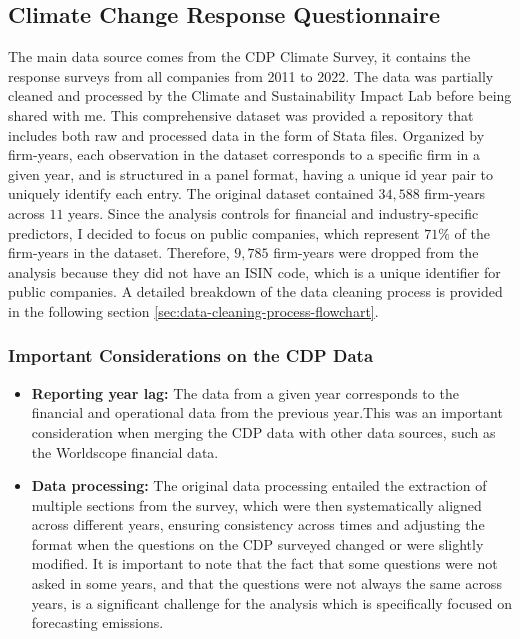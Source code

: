 \subsection{Climate Change Response Questionnaire}
The main data source comes from the CDP Climate Survey, it contains the response surveys from all companies from 2011 to 2022. The data was partially cleaned and processed by the Climate and Sustainability Impact Lab \cite{HarvardD3Lab2024} before being shared with me. This comprehensive dataset was provided a repository that includes both raw and processed data in the form of Stata files. Organized by firm-years, each observation in the dataset corresponds to a specific firm in a given year, and is structured in a panel format, having a unique id year pair to uniquely identify each entry. The original dataset contained $34,588$ firm-years across $11$ years. Since the analysis controls for financial and industry-specific predictors, I decided to focus on public companies, which represent $71\%$ of the firm-years in the dataset. Therefore, $9,785$ firm-years were dropped from the analysis because they did not have an ISIN code, which is a unique identifier for public companies. A detailed breakdown of the data cleaning process is provided in the following section \ref{sec:data-cleaning-process-flowchart}.

\subsubsection{Important Considerations on the CDP Data}
\begin{itemize}
    \item \textbf{Reporting year lag:} The data from a given year corresponds to the financial and operational data from the previous year.This was an important consideration when merging the CDP data with other data sources, such as the Worldscope financial data.
    \item \textbf{Data processing:} The original data processing entailed the extraction of multiple sections from the survey, which were then systematically aligned across different years, ensuring consistency across times and adjusting the format when the questions on the CDP surveyed changed or were slightly modified. It is important to note that the fact that some questions were not asked in some years, and that the questions were not always the same across years, is a significant challenge for the analysis which is specifically focused on forecasting emissions.

\end{itemize}


